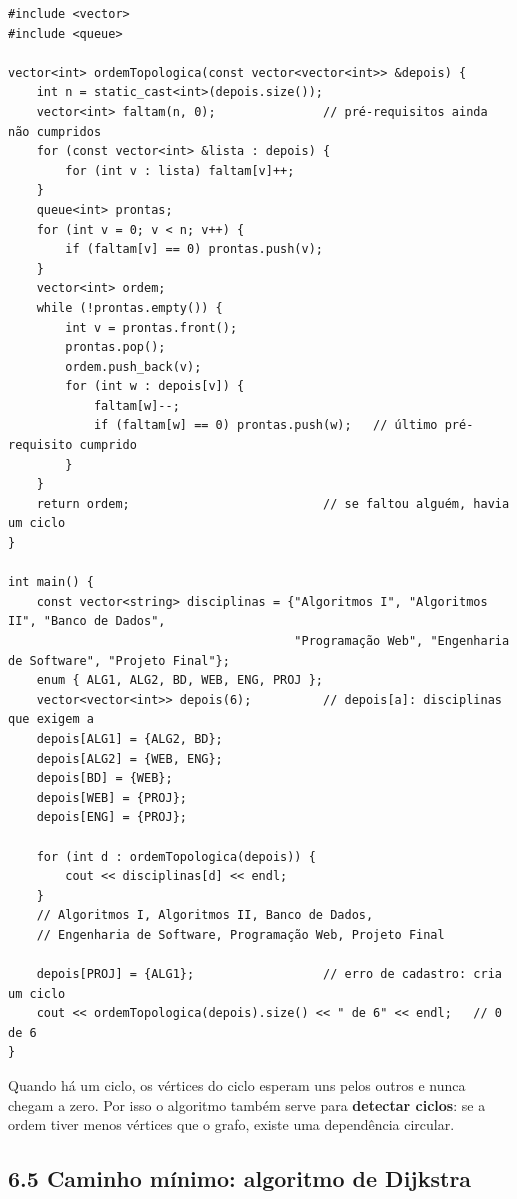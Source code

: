 \begin{codigo}
\begin{Verbatim}[breaklines=true, breaksymbolleft={}, fontsize=\footnotesize]
#include <vector>
#include <queue>

vector<int> ordemTopologica(const vector<vector<int>> &depois) {
    int n = static_cast<int>(depois.size());
    vector<int> faltam(n, 0);               // pré-requisitos ainda não cumpridos
    for (const vector<int> &lista : depois) {
        for (int v : lista) faltam[v]++;
    }
    queue<int> prontas;
    for (int v = 0; v < n; v++) {
        if (faltam[v] == 0) prontas.push(v);
    }
    vector<int> ordem;
    while (!prontas.empty()) {
        int v = prontas.front();
        prontas.pop();
        ordem.push_back(v);
        for (int w : depois[v]) {
            faltam[w]--;
            if (faltam[w] == 0) prontas.push(w);   // último pré-requisito cumprido
        }
    }
    return ordem;                           // se faltou alguém, havia um ciclo
}

int main() {
    const vector<string> disciplinas = {"Algoritmos I", "Algoritmos II", "Banco de Dados",
                                        "Programação Web", "Engenharia de Software", "Projeto Final"};
    enum { ALG1, ALG2, BD, WEB, ENG, PROJ };
    vector<vector<int>> depois(6);          // depois[a]: disciplinas que exigem a
    depois[ALG1] = {ALG2, BD};
    depois[ALG2] = {WEB, ENG};
    depois[BD] = {WEB};
    depois[WEB] = {PROJ};
    depois[ENG] = {PROJ};

    for (int d : ordemTopologica(depois)) {
        cout << disciplinas[d] << endl;
    }
    // Algoritmos I, Algoritmos II, Banco de Dados,
    // Engenharia de Software, Programação Web, Projeto Final

    depois[PROJ] = {ALG1};                  // erro de cadastro: cria um ciclo
    cout << ordemTopologica(depois).size() << " de 6" << endl;   // 0 de 6
}
\end{Verbatim}
\end{codigo}

Quando há um ciclo, os vértices do ciclo esperam uns pelos outros e nunca chegam a zero. Por isso o algoritmo também serve para \textbf{detectar ciclos}: se a ordem tiver menos vértices que o grafo, existe uma dependência circular.

\subsection{6.5 Caminho mínimo: algoritmo de Dijkstra}

